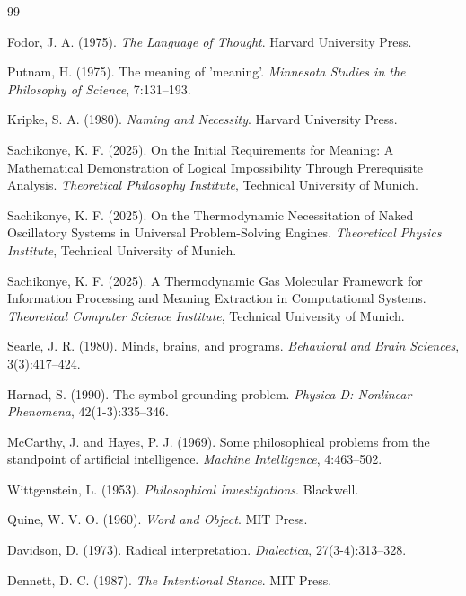 \documentclass[11pt,a4paper]{article}
\begin{document}

\begin{thebibliography}{99}

Fodor, J. A. (1975). \textit{The Language of Thought}. Harvard University Press.

Putnam, H. (1975). The meaning of 'meaning'. \textit{Minnesota Studies in the Philosophy of Science}, 7:131--193.

Kripke, S. A. (1980). \textit{Naming and Necessity}. Harvard University Press.

Sachikonye, K. F. (2025). On the Initial Requirements for Meaning: A Mathematical Demonstration of Logical Impossibility Through Prerequisite Analysis. \textit{Theoretical Philosophy Institute}, Technical University of Munich.

Sachikonye, K. F. (2025). On the Thermodynamic Necessitation of Naked Oscillatory Systems in Universal Problem-Solving Engines. \textit{Theoretical Physics Institute}, Technical University of Munich.

Sachikonye, K. F. (2025). A Thermodynamic Gas Molecular Framework for Information Processing and Meaning Extraction in Computational Systems. \textit{Theoretical Computer Science Institute}, Technical University of Munich.

Searle, J. R. (1980). Minds, brains, and programs. \textit{Behavioral and Brain Sciences}, 3(3):417--424.

Harnad, S. (1990). The symbol grounding problem. \textit{Physica D: Nonlinear Phenomena}, 42(1-3):335--346.

McCarthy, J. and Hayes, P. J. (1969). Some philosophical problems from the standpoint of artificial intelligence. \textit{Machine Intelligence}, 4:463--502.

Wittgenstein, L. (1953). \textit{Philosophical Investigations}. Blackwell.

Quine, W. V. O. (1960). \textit{Word and Object}. MIT Press.

Davidson, D. (1973). Radical interpretation. \textit{Dialectica}, 27(3-4):313--328.

Dennett, D. C. (1987). \textit{The Intentional Stance}. MIT Press.


\end{thebibliography}
\end{document}
